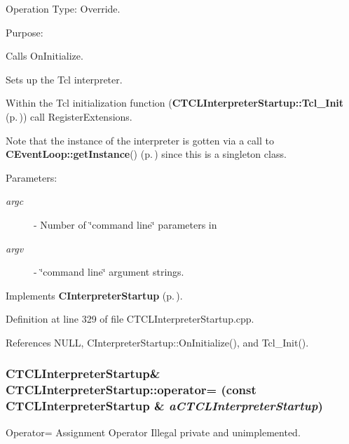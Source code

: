 Operation Type: Override.

Purpose:

\begin{CompactItemize}
\item 
Calls On\-Initialize.\item 
Sets up the Tcl interpreter.\item 
Within the Tcl initialization function ({\bf CTCLInterpreter\-Startup::Tcl\_\-Init} {\rm (p.\,\pageref{classCTCLInterpreterStartup_e0})}) call Register\-Extensions.\end{CompactItemize}
Note that the instance of the interpreter is gotten via a call to {\bf CEvent\-Loop::get\-Instance}() {\rm (p.\,\pageref{classCEventLoop_d0})} since this is a singleton class.\begin{Desc}
\item[Parameters: ]\par
\begin{description}
\item[{\em 
argc}]- Number of \char`\"{}command line\char`\"{} parameters in  \item[{\em 
argv}]- \char`\"{}command line\char`\"{} argument strings. \end{description}
\end{Desc}


Implements {\bf CInterpreter\-Startup} {\rm (p.\,\pageref{classCInterpreterStartup_c0})}.

Definition at line 329 of file CTCLInterpreter\-Startup.cpp.

References NULL, CInterpreter\-Startup::On\-Initialize(), and Tcl\_\-Init().
\subsubsection{\setlength{\rightskip}{0pt plus 5cm}CTCLInterpreter\-Startup\& CTCLInterpreter\-Startup::operator= (const CTCLInterpreter\-Startup \& {\em a\-CTCLInterpreter\-Startup})\hspace{0.3cm}{\tt  [private]}}\label{classCTCLInterpreterStartup_c2}


Operator= Assignment Operator Illegal private and unimplemented.

